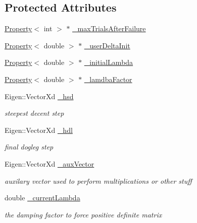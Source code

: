 \subsection*{Protected Attributes}
\begin{DoxyCompactItemize}
\item 
\hyperlink{classg2o_1_1Property}{Property}$<$ int $>$ $\ast$ \hyperlink{classg2o_1_1OptimizationAlgorithmDogleg_a5993c68e69cd037b1420b4addf9f7e50}{\+\_\+max\+Trials\+After\+Failure}
\item 
\hyperlink{classg2o_1_1Property}{Property}$<$ double $>$ $\ast$ \hyperlink{classg2o_1_1OptimizationAlgorithmDogleg_ae77ffaea89872affeb61f122f20efeb9}{\+\_\+user\+Delta\+Init}
\item 
\hyperlink{classg2o_1_1Property}{Property}$<$ double $>$ $\ast$ \hyperlink{classg2o_1_1OptimizationAlgorithmDogleg_a3a94c7696f07e3def38ec96a1979babd}{\+\_\+initial\+Lambda}
\item 
\hyperlink{classg2o_1_1Property}{Property}$<$ double $>$ $\ast$ \hyperlink{classg2o_1_1OptimizationAlgorithmDogleg_a6855a511dc998efef7eaa0ef99e1b814}{\+\_\+lamdba\+Factor}
\item 
Eigen\+::\+Vector\+Xd \hyperlink{classg2o_1_1OptimizationAlgorithmDogleg_a8f4ee408fbf3999063d094cf61e852b7}{\+\_\+hsd}
\begin{DoxyCompactList}\small\item\em steepest decent step \end{DoxyCompactList}\item 
Eigen\+::\+Vector\+Xd \hyperlink{classg2o_1_1OptimizationAlgorithmDogleg_aaf433c824153a7bd76b27690eb53113b}{\+\_\+hdl}
\begin{DoxyCompactList}\small\item\em final dogleg step \end{DoxyCompactList}\item 
Eigen\+::\+Vector\+Xd \hyperlink{classg2o_1_1OptimizationAlgorithmDogleg_a225092fe67ce75eb64011c1f45d8d936}{\+\_\+aux\+Vector}
\begin{DoxyCompactList}\small\item\em auxilary vector used to perform multiplications or other stuff \end{DoxyCompactList}\item 
double \hyperlink{classg2o_1_1OptimizationAlgorithmDogleg_aacc051a6740fc6017dac7c424dc7df3d}{\+\_\+current\+Lambda}
\begin{DoxyCompactList}\small\item\em the damping factor to force positive definite matrix \end{DoxyCompactList}\item 

\end{DoxyCompactItemize}
